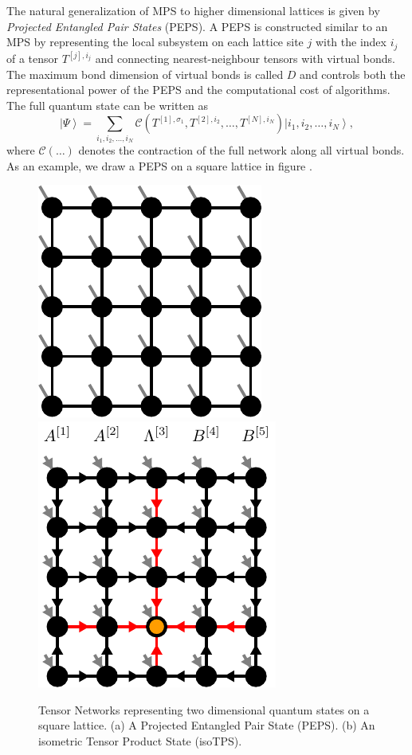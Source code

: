 The natural generalization of MPS to higher dimensional lattices is given by \textit{Projected Entangled Pair States} (PEPS). A PEPS is constructed similar to an MPS by representing the local subsystem on each lattice site $j$ with the index $i_j$ of a tensor $T^{[j],i_j}$ and connecting nearest-neighbour tensors with virtual bonds. The maximum bond dimension of virtual bonds is called $D$ and controls both the representational power of the PEPS and the computational cost of algorithms. The full quantum state can be written as
\begin{equation}
	\label{eq:PEPS_definition_general}
	\left|\Psi\right\rangle = \sum_{i_1,i_2,\dots,i_N} \mathcal{C}\left(T^{[1],\sigma_1}, T^{[2],i_2}, \dots, T^{[N],i_N}\right) \left|i_1,i_2,\dots,i_N\right\rangle,
\end{equation}
where $\mathcal{C}(\dots)$ denotes the contraction of the full network along all virtual bonds. As an example, we draw a PEPS on a square lattice in figure . \par
\begin{figure}
	\centering
	\subcaptionbox{\label{fig:square_PEPS}}
	{%
		\includegraphics[scale=1]{figures/tikz/Tensor_Networks/isoTPS_structure/isoTPS_structure_a.pdf}
	}
	\quad\quad
	\subcaptionbox{\label{fig:square_isoTPS}}
	{%
		\includegraphics[scale=1]{figures/tikz/Tensor_Networks/isoTPS_structure/isoTPS_structure_b.pdf}
	}
	\caption{Tensor Networks representing two dimensional quantum states on a square lattice. (a) A Projected Entangled Pair State (PEPS). (b) An isometric Tensor Product State (isoTPS).}
	\label{fig:square_PEPS_and_isoTPS}
\end{figure}
